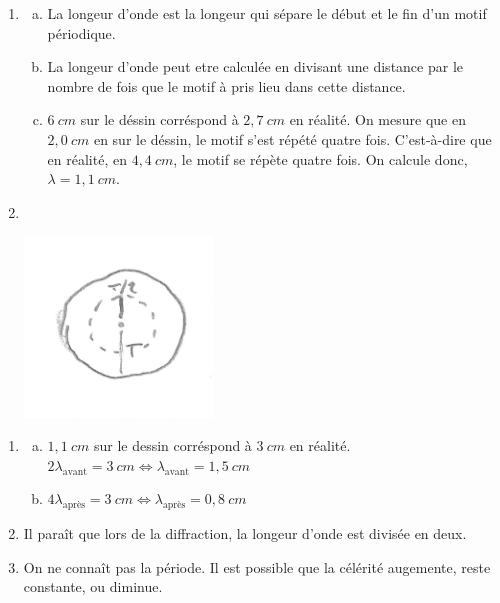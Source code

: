 \documentclass[12pt, a4paper]{article}
\begin{document}
    \begin{Exercise}[number={30}]
        \begin{enumerate}[1.]
            \item   \begin{enumerate}[a.]
                        \item La longeur d'onde est la longeur qui sépare le début et le fin d'un motif périodique.
                        \item La longeur d'onde peut etre calculée en divisant une distance par le nombre de fois que le motif à pris lieu dans cette distance.
                        \item $6\ cm$ sur le déssin corréspond à $2{,}7\ cm$ en réalité. On mesure que en $2{,}0\ cm$ en sur le déssin, le motif s'est répété quatre fois. C'est-à-dire que en réalité, en $4{,}4\ cm$, le motif se répète quatre fois. On calcule donc, $\lambda=1{,}1\ cm$.
                    \end{enumerate}
            \item \ \\\parbox{\linewidth}{
                        \centering
                        \includegraphics[width=5cm]{EX30img1.jpg}
                    } \bigbreak
        \end{enumerate}
    \end{Exercise}

    \begin{Exercise}[number={32}]
        \begin{enumerate}[1.]
            \item   \begin{enumerate}[a.]
                \item $1{,}1\ cm$ sur le dessin corréspond à $3\ cm$ en réalité. \\ $2\lambda_\text{avant}=3\ cm \iff \lambda_\text{avant}=1{,}5\ cm$
                \item $4\lambda_\text{après}=3\ cm \iff \lambda_\text{après}=0{,}8\ cm$
            \end{enumerate}
            \item Il paraît que lors de la diffraction, la longeur d'onde est divisée en deux.
            \item On ne connaît pas la période. Il est possible que la célérité augemente, reste constante, ou diminue.
        \end{enumerate}
    \end{Exercise}
\end{document}
